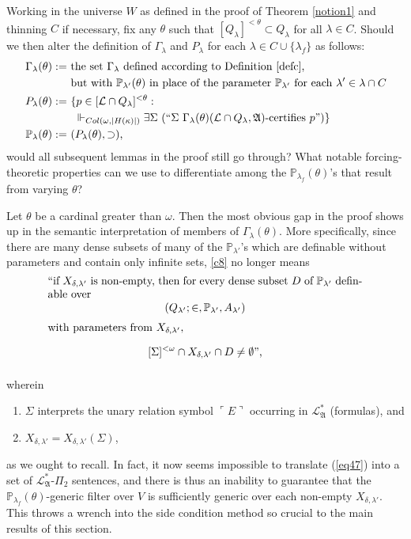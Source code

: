 \documentclass[12pt]{article}
\numberwithin{equation}{section}
\begin{document}
Working in the universe $W$ as defined in the proof of Theorem \ref{notion1} and thinning $C$ if necessary, fix any $\theta$ such that $[Q_{\lambda}]^{< \theta} \subset Q_{\lambda}$ for all $\lambda \in C$. Should we then alter the definition of $\Gamma_{\lambda}$ and $P_{\lambda}$ for each $\lambda \in C \cup \{\lambda_f\}$ as follows:
\begin{align*}
    \Gamma_{\lambda}(\theta) := \ & \text{the set } \Gamma_{\lambda} \text{ defined according to Definition \ref{defc},} \\
    & \text{but with } \mathbb{P}_{\lambda'}(\theta) \text{ in place of the parameter } \mathbb{P}_{\lambda'} \text{ for each } \lambda' \in \lambda \cap C \\
    P_{\lambda}(\theta) := \ & \{p \in [\mathcal{L} \cap Q_{\lambda}]^{< \theta} : \\
    & \ \Vdash_{Col(\omega, |H(\kappa)|)} \exists \Sigma \ (``\Sigma \ \Gamma_{\lambda}(\theta) (\mathcal{L} \cap Q_{\lambda}, \mathfrak{A}) \text{-certifies } p")\} \\
    \mathbb{P}_{\lambda}(\theta) := \ & (P_{\lambda}(\theta), \supset) \text{,}
\end{align*}
would all subsequent lemmas in the proof still go through? What notable forcing-theoretic properties can we use to differentiate among the $\mathbb{P}_{\lambda_f}(\theta)$'s that result from varying $\theta$? 

Let $\theta$ be a cardinal greater than $\omega$. Then the most obvious gap in the proof shows up in the semantic interpretation of members of $\Gamma_{\lambda}(\theta)$. More specifically, since there are many dense subsets of many of the $\mathbb{P}_{\lambda'}$'s which are definable without parameters and contain only infinite sets, \ref{c8} no longer means
\begin{equation}
    \label{eq47}
    \parbox{\dimexpr\linewidth-6em}{
        ``if $X_{\delta, \lambda'}$ is non-empty, then for every dense subset $D$ of $\mathbb{P}_{\lambda'}$ definable over $$(Q_{\lambda'}; \in, \mathbb{P}_{\lambda'}, A_{\lambda'})$$ with parameters from $X_{\delta, \lambda'}$, $$[\Sigma]^{< \omega} \cap X_{\delta, \lambda'} \cap D \neq \emptyset \text{'',}$$ 
    }
\end{equation}
wherein 
\begin{enumerate}[label=(\alph*)]
    \item $\Sigma$ interprets the unary relation symbol $\ulcorner E \urcorner$ occurring in $\mathcal{L}^*_{\mathfrak{A}}$ (formulas), and
    \item $X_{\delta, \lambda'} = X_{\delta, \lambda'}(\Sigma)$,
\end{enumerate}
as we ought to recall. In fact, it now seems impossible to translate (\ref{eq47}) into a set of $\mathcal{L}^*_{\mathfrak{A}}$-$\Pi_2$ sentences, and there is thus an inability to guarantee that the $\mathbb{P}_{\lambda_f}(\theta)$-generic filter over $V$ is sufficiently generic over each non-empty $X_{\delta, \lambda'}$. This throws a wrench into the side condition method so crucial to the main results of this section.  
\end{document}

